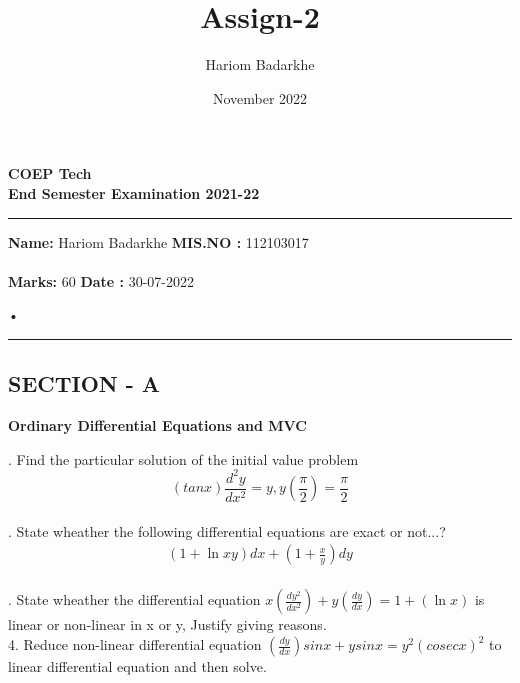\documentclass{article}
\title{Assign-2}
\author{Hariom Badarkhe}
\date{November 2022}
\begin{document}
\maketitle

\newpage
\tableofcontents
\newpage
\begin{center}
\huge \bf {COEP Tech}
\vspace {7mm}\\
\large \textbf{End Semester Examination 2021-22}

\end{center}

\noindent\rule{\textwidth}{1.5pt}

\noindent \textbf {Name:} Hariom Badarkhe
\hfill \textbf{MIS.NO : }112103017\\\\
\noindent \textbf {Marks:} 60 \hfill \textbf{Date  : }30-07-2022\\

\begin{tabular}{•}

\end{tabular}

\noindent\rule{\textwidth}{1.5pt}

\vspace{5mm}
\subsection{SECTION - A}
\large \textbf{Ordinary Differential Equations and MVC}
\vspace{7mm}
 
. Find the particular solution of the initial value problem \\
$$ (tanx)\frac{d^2y}{dx^2} = y,y(\frac{\pi}{2})= \frac{\pi}{2} $$\\

. State wheather the following differential equations are \indent exact or not...?
\begin{align*}
(1+\ln xy)dx + (1+\frac{x}{y})dy\\
\end{align*}



. State wheather the differential equation $x(\frac{dy^2}{dx^2}) + y(\frac{dy}{dx}) = 1 + (\ln x)$ is  linear or non-linear in x or y, Justify giving reasons.\\

\large 4. Reduce non-linear differential equation  $(\frac{dy}{dx})sinx + y sinx = y^2(cosecx)^2 $ to linear differential equation and then solve.\\
\end{document}
